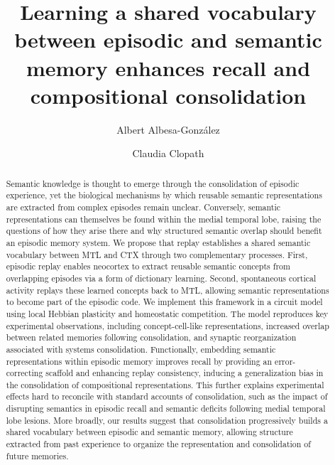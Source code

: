 \documentclass{article}
\title{Learning a shared vocabulary between episodic and semantic memory enhances recall and compositional consolidation}
\author[1, 2]{Albert Albesa-González}
\author[1]{Claudia Clopath}
\affil[1]{Department of Bioengineering, Imperial College London, London, UK}
\affil[2]{Sainsbury Wellcome Centre for Neural Circuits and Behaviour, \newline University College London, London, UK}
\begin{document}
\maketitle
\begin{abstract}
\noindent Semantic knowledge is thought to emerge through the consolidation of episodic experience, yet the biological mechanisms by which reusable semantic representations are extracted from complex episodes remain unclear. Conversely, semantic representations can themselves be found within the medial temporal lobe, raising the questions of how they arise there and why structured semantic overlap should benefit an episodic memory system. We propose that replay establishes a shared semantic vocabulary between MTL and CTX through two complementary processes. First, episodic replay enables neocortex to extract reusable semantic concepts from overlapping episodes via a form of dictionary learning. Second, spontaneous cortical activity replays these learned concepts back to MTL, allowing semantic representations to become part of the episodic code. We implement this framework in a circuit model using local Hebbian plasticity and homeostatic competition. The model reproduces key experimental observations, including concept-cell-like representations, increased overlap between related memories following consolidation, and synaptic reorganization associated with systems consolidation. Functionally, embedding semantic representations within episodic memory improves recall by providing an error-correcting scaffold and enhancing replay consistency, inducing a generalization bias in the consolidation of compositional representations. This further explains experimental effects hard to reconcile with standard accounts of consolidation, such as the impact of disrupting semantics in episodic recall and semantic deficits following medial temporal lobe lesions. More broadly, our results suggest that consolidation progressively builds a shared vocabulary between episodic and semantic memory, allowing structure extracted from past experience to organize the representation and consolidation of future memories.
\end{abstract}
\end{document}
